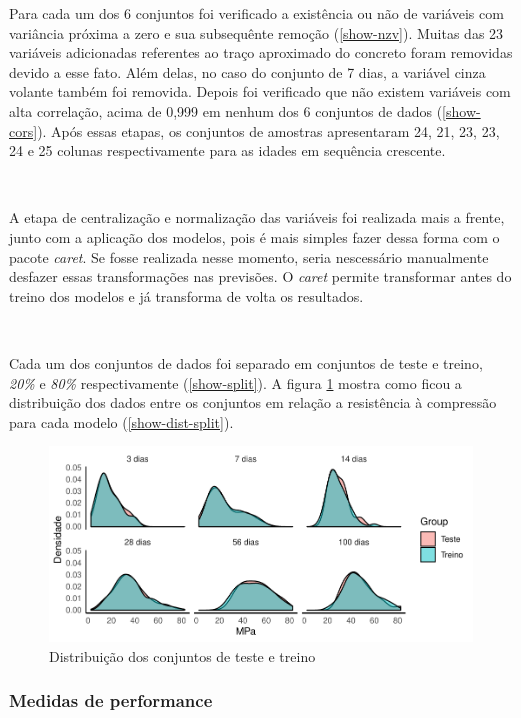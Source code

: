 \documentclass[]{article}
\begin{document}
Para cada um dos 6 conjuntos foi verificado a existência ou não de
variáveis com variância próxima a zero e sua subsequênte remoção
(\ref{show-nzv}). Muitas das 23 variáveis adicionadas referentes ao
traço aproximado do concreto foram removidas devido a esse fato. Além
delas, no caso do conjunto de 7 dias, a variável cinza volante também
foi removida. Depois foi verificado que não existem variáveis com alta
correlação, acima de 0,999 em nenhum dos 6 conjuntos de dados
(\ref{show-cors}). Após essas etapas, os conjuntos de amostras
apresentaram 24, 21, 23, 23, 24 e 25 colunas respectivamente para as
idades em sequência crescente.

~

A etapa de centralização e normalização das variáveis foi realizada mais
a frente, junto com a aplicação dos modelos, pois é mais simples fazer
dessa forma com o pacote \emph{caret}. Se fosse realizada nesse momento,
seria nescessário manualmente desfazer essas transformações nas
previsões. O \emph{caret} permite transformar antes do treino dos
modelos e já transforma de volta os resultados.

~

Cada um dos conjuntos de dados foi separado em conjuntos de teste e
treino, \emph{20\%} e \emph{80\%} respectivamente (\ref{show-split}). A
figura \ref{fig:dist-split} mostra como ficou a distribuição dos dados
entre os conjuntos em relação a resistência à compressão para cada
modelo (\ref{show-dist-split}).

\begin{figure}

{\centering \includegraphics{paper_PT_files/figure-latex/dist-split-1} 

}

\caption{Distribuição dos conjuntos de teste e treino}\label{fig:dist-split}
\end{figure}

\hypertarget{medidas-de-performance}{%
\subsubsection{Medidas de performance}\label{medidas-de-performance}}
\end{document}
